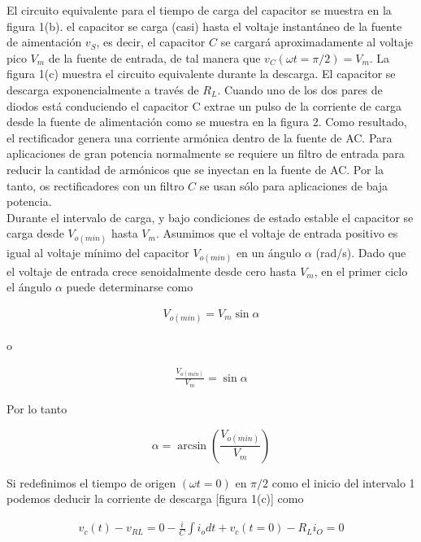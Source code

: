 \documentclass[12pt]{article}
\begin{document}
	\noindent El circuito equivalente para el tiempo de carga del capacitor se muestra en la figura 1(b). el capacitor se carga (casi) hasta el voltaje instantáneo de la fuente de aimentación $v_S$, es decir, el capacitor $C$ se cargará aproximadamente al voltaje pico $V_m$ de la fuente de entrada, de tal manera que $v_C (\omega t=\pi/2)=V_m$. La figura 1(c) muestra el circuito equivalente durante la descarga. El capacitor se descarga exponencialmente a través de $R_L$. Cuando uno de los dos pares de diodos está conduciendo el capacitor C extrae un pulso de la corriente de carga desde la fuente de alimentación como se muestra en la figura 2. Como resultado, el rectificador genera una corriente armónica dentro de la fuente de AC. Para aplicaciones de gran potencia normalmente se requiere un filtro de entrada para reducir la cantidad de armónicos que se inyectan en la fuente de AC. Por la tanto, os rectificadores con un filtro $C$ se usan sólo para aplicaciones de baja potencia.\\
	
	\noindent Durante el intervalo de carga, y bajo condiciones de estado estable el capacitor se carga desde $V_{o(min)}$  hasta $V_m$. Asumimos que el voltaje de entrada positivo es igual al voltaje mínimo del capacitor $V_{o(min)}$ en un ángulo $\alpha$ (rad/s). Dado que el voltaje de entrada crece senoidalmente desde cero hasta $V_m$, en el primer ciclo el ángulo $\alpha$ puede determinarse como
	
	\begin{align}
		V_{o(min)} = V_m\sin{\alpha}
	\end{align}
	
	\noindent o
	
	\begin{align}
		\frac{V_{o(min)}}{V_m} = \sin{\alpha}\nonumber
	\end{align}
	
	\noindent Por lo tanto
	\begin{tcolorbox}[colback=red!5!white,colframe=red!75!black,arc=0mm,boxrule=0mm,width=(\linewidth+0.5cm)]
		\begin{equation}
			\alpha = \arcsin \left( {\frac{V_{o(min)}}{V_m}} \right) 
		\end{equation}
	\end{tcolorbox}
	
	Si redefinimos el tiempo de origen $(\omega t = 0)$ en $\pi / 2$ como el inicio del intervalo 1 podemos deducir la corriente de descarga [figura 1(c)] como
	
	\begin{align}
		v_c(t) - v_{RL} = 0
		-\frac{i}{C}\int i_o dt + v_c (t=0) - R_L i_O = 0
	\end{align}
	
\end{document}
